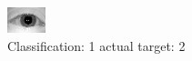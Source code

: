 \begin{figure}[h!]
\begin{center}
\includegraphics[width=0.60\columnwidth]{figures/ID950_class_1_target_2.png}
\end{center}
\caption{ Classification: 1 actual target: 2}
\label{fig:ID950_class_1_target_2}
\end{figure}
